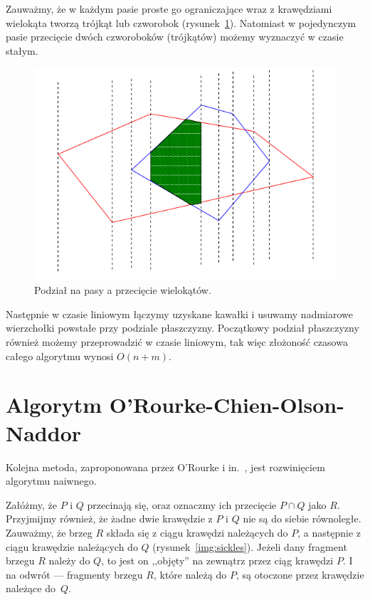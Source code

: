 Zauważmy, że w każdym pasie proste go ograniczające wraz z krawędziami
wielokąta tworzą trójkąt lub czworobok
(rysunek~\ref{img:ShamosHoey76}). Natomiast w pojedynczym pasie
przecięcie dwóch czworoboków (trójkątów) możemy wyznaczyć w czasie
stałym.

\begin{figure}[htb]
  \centering
  \includegraphics[scale=0.5]{img/ShamosHoey76}
  \caption{Podział na pasy a przecięcie
    wielokątów.\label{img:ShamosHoey76}}
\end{figure}

Następnie w czasie liniowym łączymy uzyskane kawałki i usuwamy
nadmiarowe wierzchołki powstałe przy podziale płaszczyzny. Początkowy
podział płaszczyzny również możemy przeprowadzić w czasie liniowym,
tak więc złożoność czasowa całego algorytmu wynosi $O(n + m)$.

\section{Algorytm O'Rourke-Chien-Olson-Naddor}
Kolejna metoda, zaproponowana przez O'Rourke i in.~\cite{Orourke98},
jest rozwinięciem algorytmu naiwnego.

Załóżmy, że $P$ i $Q$ przecinają się, oraz oznaczmy ich przecięcie $P
\cap Q$ jako $R$. Przyjmijmy również, że żadne dwie krawędzie z $P$ i
$Q$ nie są do siebie równoległe. Zauważmy, że brzeg $R$ składa się z
ciągu krawędzi należących do $P$, a następnie z ciągu krawędzie
należących do $Q$ (rysunek~\ref{img:sickles}). Jeżeli dany fragment
brzegu $R$ należy do $Q$, to jest on ,,objęty'' na zewnątrz przez ciąg
krawędzi $P$. I na odwrót --- fragmenty brzegu $R$, które należą do
$P$, są otoczone przez krawędzie należące do~$Q$.

